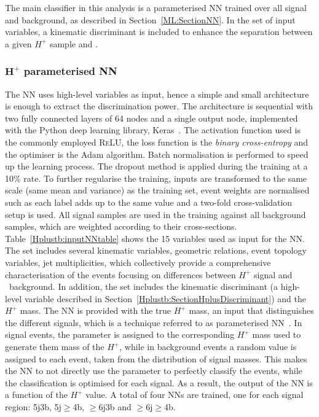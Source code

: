 The main classifier in this analysis is a parameterised NN trained over all signal and background, as described in Section~\ref{ML:SectionNN}. In the set of input variables, a kinematic discriminant is included to enhance the separation between a given $H^+$ sample and \ttjets.

\subsubsection{$\bm{H^+}$ parameterised NN}
\label{sec:HplusPNN}
The NN uses high-level variables as input, hence a simple and small architecture is enough to extract the discrimination power. The architecture is sequential with two fully connected layers of 64 nodes and a single output node, implemented with the Python deep learning library, Keras~\cite{chollet2015keras}. The activation function used is the commonly employed \textsc{ReLU}, the loss function is the \textit{binary cross-entropy} and the optimiser is the Adam algorithm. Batch normalisation is performed to speed up the learning process. The dropout method is applied during the training at a 10\% rate. To further regularise the training, inputs are transformed to the same scale (same mean and variance) as the training set, event weights are normalised such as each label adds up to the same value and a two-fold cross-validation setup is used. All signal samples are used in the training against all background samples, which are weighted according to their cross-sections.\\

Table~\ref{Hplustb:inputNNtable} shows the 15 variables used as input for the NN. The set includes several kinematic variables, geometric relations, event topology variables, jet multiplicities, which collectively provide a comprehensive characterisation of the events focusing on differences between $H^+$ signal and \ttbar\ background. In addition, the set includes the kinematic discriminant (a high-level variable described in Section~\ref{Hplustb:SectionHplusDiscriminant}) and the $H^+$ mass. The NN is provided with the true $H^+$ mass, an input that distinguishes the different signals, which is a technique referred to as parameterised NN~\cite{Baldi_2016}. In signal events, the parameter is assigned to the corresponding $H^+$ mass used to generate them mass of the $H^+$, while in background events a random value is assigned to each event, taken from the distribution of signal masses. This makes the NN to not directly use the parameter to perfectly classify the events, while the classification is optimised for each signal. As a result, the output of the NN is a function of the $H^+$ value. A total of four NNs are trained, one for each signal region: 5j3b, 5j$\geq$4b, $\geq$6j3b and $\geq$6j$\geq$4b.\\

